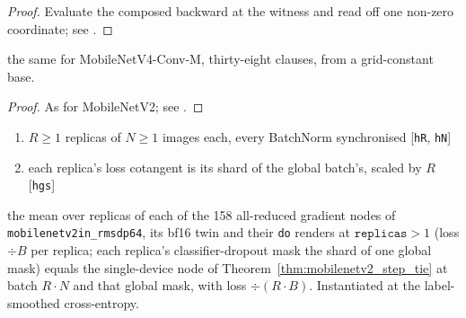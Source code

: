 \begin{proof}
\leanok
Evaluate the composed backward at the witness and read off one non-zero
coordinate; see .
\end{proof}

\begin{theorem}
  \label{thm:mobilenetv4_seal}
  \leanok
  \Prove{} the same for MobileNetV4-Conv-M, thirty-eight clauses, from a
  grid-constant base.
\end{theorem}

\begin{proof}
\leanok
As for MobileNetV2; see .
\end{proof}

\begin{theorem}
  \label{thm:mobilenetv2_sync_tie}
  \leanok
  \Assume{}
  \begin{enumerate}
    \item \(R \ge 1\) replicas of \(N \ge 1\) images each, every BatchNorm
          synchronised \hfill[\texttt{hR}, \texttt{hN}]
    \item each replica's loss cotangent is its shard of the global batch's,
          scaled by \(R\) \hfill[\texttt{hgs}]
  \end{enumerate}
  \Prove{} the mean over replicas of each of the 158 all-reduced gradient
  nodes of \texttt{mobilenetv2in\_rmsdp64}, its bf16 twin and their
  \texttt{do} renders at \(\texttt{replicas} > 1\) (loss \(\div B\) per
  replica; each replica's classifier-dropout mask the shard of one global
  mask) equals the single-device node of
  Theorem~\ref{thm:mobilenetv2_step_tie} at batch \(R \cdot N\) and that
  global mask, with loss \(\div (R \cdot B)\). Instantiated at the
  label-smoothed cross-entropy.
\end{theorem}

